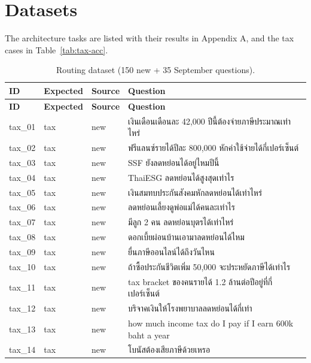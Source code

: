 \documentclass[11pt,a4paper]{article}
\begin{document}
\section{Datasets}
The architecture tasks are listed with their results in Appendix A, and the tax cases in Table~\ref{tab:tax-acc}.
{\scriptsize
\begin{longtable}{lllp{9.5cm}}
\caption{Routing dataset (150 new + 35 September questions).}\label{tab:app-routing}\\
\toprule
\textbf{ID} & \textbf{Expected} & \textbf{Source} & \textbf{Question} \\
\midrule
\endfirsthead
\toprule
\textbf{ID} & \textbf{Expected} & \textbf{Source} & \textbf{Question} \\
\midrule
\endhead
\bottomrule
\endfoot
tax\_\allowbreak{}01 & tax & new & {\thaifont เงินเดือนเดือนละ }42,000 {\thaifont ปีนี้ต้องจ่ายภาษีประมาณเท่าไหร่} \\
tax\_\allowbreak{}02 & tax & new & {\thaifont ฟรีแลนซ์รายได้ปีละ }800,000 {\thaifont หักค่าใช้จ่ายได้กี่เปอร์เซ็นต์} \\
tax\_\allowbreak{}03 & tax & new & SSF {\thaifont ยังลดหย่อนได้อยู่ไหมปีนี้} \\
tax\_\allowbreak{}04 & tax & new & ThaiESG {\thaifont ลดหย่อนได้สูงสุดเท่าไร} \\
tax\_\allowbreak{}05 & tax & new & {\thaifont เงินสมทบประกันสังคมหักลดหย่อนได้เท่าไหร่} \\
tax\_\allowbreak{}06 & tax & new & {\thaifont ลดหย่อนเลี้ยงดูพ่อแม่ได้คนละเท่าไร} \\
tax\_\allowbreak{}07 & tax & new & {\thaifont มีลูก }2 {\thaifont คน ลดหย่อนบุตรได้เท่าไหร่} \\
tax\_\allowbreak{}08 & tax & new & {\thaifont ดอกเบี้ยผ่อนบ้านเอามาลดหย่อนได้ไหม} \\
tax\_\allowbreak{}09 & tax & new & {\thaifont ยื่นภาษีออนไลน์ได้ถึงวันไหน} \\
tax\_\allowbreak{}10 & tax & new & {\thaifont ถ้าซื้อประกันชีวิตเพิ่ม }50,000 {\thaifont จะประหยัดภาษีได้เท่าไร} \\
tax\_\allowbreak{}11 & tax & new & tax bracket {\thaifont ของคนรายได้ }1.2 {\thaifont ล้านต่อปีอยู่ที่กี่เปอร์เซ็นต์} \\
tax\_\allowbreak{}12 & tax & new & {\thaifont บริจาคเงินให้โรงพยาบาลลดหย่อนได้กี่เท่า} \\
tax\_\allowbreak{}13 & tax & new & how much income tax do I pay if I earn 600k baht a year \\
tax\_\allowbreak{}14 & tax & new & {\thaifont โบนัสต้องเสียภาษีด้วยเหรอ} \\

\end{longtable}}
\end{document}
